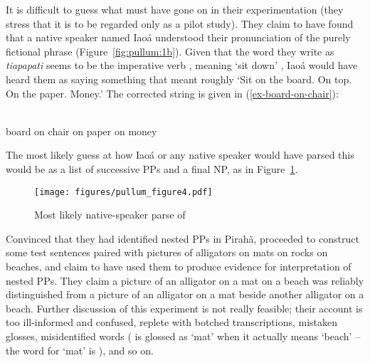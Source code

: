 \documentclass[output=paper,colorlinks,citecolor=brown
]{langscibook}
\begin{document}
It is difficult to guess what must have gone on in their experimentation
(they stress that it is to be regarded only as a pilot study). They claim
to have found that a native speaker named Iao{\'a} understood their
pronunciation of the purely fictional phrase (Figure~\ref{fig:pullum:1b}). Given that the word
they write as \textit{tiapapati} seems to be the imperative verb
, meaning `sit down'
\citep[786--787]{EverGibs19}, Iao{\'a} would have heard them as
saying something that meant roughly `Sit on the board. On top. On
the paper. Money.' The corrected string is given in (\ref{ex-board-on-chair}):

\ea
\label{ex-board-on-chair}
\gll {}  
    \\
board on chair on paper on money\\
\z

The most likely guess at how Iao{\'a} or any native speaker would
have parsed this would be as a list of successive PPs and a final NP,
as in Figure~\ref{fig:pullum:3}.

\begin{figure}
\texttt{[image: figures/pullum\_figure4.pdf]}
 \caption{Most likely native-speaker parse of }
 \label{fig:pullum:3}
\end{figure}

Convinced that they had identified nested PPs in Pirah{\~a}, \citet[289--292]{SandaloEtAl18} proceeded to construct some
test sentences paired with pictures of alligators on mats on rocks on
beaches, and claim to have used them to produce evidence for
interpretation of nested PPs. They claim a picture of an alligator on
a mat on a beach was reliably distinguished from a picture of an
alligator on a mat beside another alligator on a beach. Further
discussion of this experiment is not really feasible; their account is
too ill-informed and confused, replete with botched transcriptions,
mistaken glosses, misidentified words ( is glossed as
`mat' when it actually means `beach' -- the word for `mat' is
), and so on.
\end{document}

